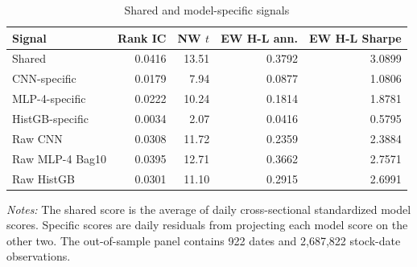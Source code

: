 \begin{table}[htbp]
\centering
\caption{Shared and model-specific signals}
\label{tab:shared_specific}
\begin{tabular}{lrrrr}
\toprule
Signal & Rank IC & NW $t$ & EW H-L ann. & EW H-L Sharpe \\
\midrule
Shared & 0.0416 & 13.51 & 0.3792 & 3.0899 \\
CNN-specific & 0.0179 & 7.94 & 0.0877 & 1.0806 \\
MLP-4-specific & 0.0222 & 10.24 & 0.1814 & 1.8781 \\
HistGB-specific & 0.0034 & 2.07 & 0.0416 & 0.5795 \\
Raw CNN & 0.0308 & 11.72 & 0.2359 & 2.3884 \\
Raw MLP-4 Bag10 & 0.0395 & 12.71 & 0.3662 & 2.7571 \\
Raw HistGB & 0.0301 & 11.10 & 0.2915 & 2.6991 \\
\bottomrule
\end{tabular}
\begin{minipage}{0.92\linewidth}
\footnotesize
\textit{Notes:} The shared score is the average of daily cross-sectional standardized model scores. Specific scores are daily residuals from projecting each model score on the other two. The out-of-sample panel contains 922 dates and 2,687,822 stock-date observations.
\end{minipage}
\end{table}
